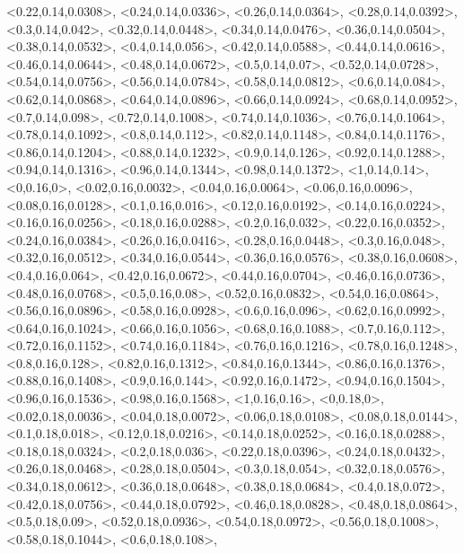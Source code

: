 \documentclass[a4paper,10pt]{article}
\begin{document}
\begin{eulernotebook}
\begin{euleroutput}
  <0.22,0.14,0.0308>,
  <0.24,0.14,0.0336>,
  <0.26,0.14,0.0364>,
  <0.28,0.14,0.0392>,
  <0.3,0.14,0.042>,
  <0.32,0.14,0.0448>,
  <0.34,0.14,0.0476>,
  <0.36,0.14,0.0504>,
  <0.38,0.14,0.0532>,
  <0.4,0.14,0.056>,
  <0.42,0.14,0.0588>,
  <0.44,0.14,0.0616>,
  <0.46,0.14,0.0644>,
  <0.48,0.14,0.0672>,
  <0.5,0.14,0.07>,
  <0.52,0.14,0.0728>,
  <0.54,0.14,0.0756>,
  <0.56,0.14,0.0784>,
  <0.58,0.14,0.0812>,
  <0.6,0.14,0.084>,
  <0.62,0.14,0.0868>,
  <0.64,0.14,0.0896>,
  <0.66,0.14,0.0924>,
  <0.68,0.14,0.0952>,
  <0.7,0.14,0.098>,
  <0.72,0.14,0.1008>,
  <0.74,0.14,0.1036>,
  <0.76,0.14,0.1064>,
  <0.78,0.14,0.1092>,
  <0.8,0.14,0.112>,
  <0.82,0.14,0.1148>,
  <0.84,0.14,0.1176>,
  <0.86,0.14,0.1204>,
  <0.88,0.14,0.1232>,
  <0.9,0.14,0.126>,
  <0.92,0.14,0.1288>,
  <0.94,0.14,0.1316>,
  <0.96,0.14,0.1344>,
  <0.98,0.14,0.1372>,
  <1,0.14,0.14>,
  <0,0.16,0>,
  <0.02,0.16,0.0032>,
  <0.04,0.16,0.0064>,
  <0.06,0.16,0.0096>,
  <0.08,0.16,0.0128>,
  <0.1,0.16,0.016>,
  <0.12,0.16,0.0192>,
  <0.14,0.16,0.0224>,
  <0.16,0.16,0.0256>,
  <0.18,0.16,0.0288>,
  <0.2,0.16,0.032>,
  <0.22,0.16,0.0352>,
  <0.24,0.16,0.0384>,
  <0.26,0.16,0.0416>,
  <0.28,0.16,0.0448>,
  <0.3,0.16,0.048>,
  <0.32,0.16,0.0512>,
  <0.34,0.16,0.0544>,
  <0.36,0.16,0.0576>,
  <0.38,0.16,0.0608>,
  <0.4,0.16,0.064>,
  <0.42,0.16,0.0672>,
  <0.44,0.16,0.0704>,
  <0.46,0.16,0.0736>,
  <0.48,0.16,0.0768>,
  <0.5,0.16,0.08>,
  <0.52,0.16,0.0832>,
  <0.54,0.16,0.0864>,
  <0.56,0.16,0.0896>,
  <0.58,0.16,0.0928>,
  <0.6,0.16,0.096>,
  <0.62,0.16,0.0992>,
  <0.64,0.16,0.1024>,
  <0.66,0.16,0.1056>,
  <0.68,0.16,0.1088>,
  <0.7,0.16,0.112>,
  <0.72,0.16,0.1152>,
  <0.74,0.16,0.1184>,
  <0.76,0.16,0.1216>,
  <0.78,0.16,0.1248>,
  <0.8,0.16,0.128>,
  <0.82,0.16,0.1312>,
  <0.84,0.16,0.1344>,
  <0.86,0.16,0.1376>,
  <0.88,0.16,0.1408>,
  <0.9,0.16,0.144>,
  <0.92,0.16,0.1472>,
  <0.94,0.16,0.1504>,
  <0.96,0.16,0.1536>,
  <0.98,0.16,0.1568>,
  <1,0.16,0.16>,
  <0,0.18,0>,
  <0.02,0.18,0.0036>,
  <0.04,0.18,0.0072>,
  <0.06,0.18,0.0108>,
  <0.08,0.18,0.0144>,
  <0.1,0.18,0.018>,
  <0.12,0.18,0.0216>,
  <0.14,0.18,0.0252>,
  <0.16,0.18,0.0288>,
  <0.18,0.18,0.0324>,
  <0.2,0.18,0.036>,
  <0.22,0.18,0.0396>,
  <0.24,0.18,0.0432>,
  <0.26,0.18,0.0468>,
  <0.28,0.18,0.0504>,
  <0.3,0.18,0.054>,
  <0.32,0.18,0.0576>,
  <0.34,0.18,0.0612>,
  <0.36,0.18,0.0648>,
  <0.38,0.18,0.0684>,
  <0.4,0.18,0.072>,
  <0.42,0.18,0.0756>,
  <0.44,0.18,0.0792>,
  <0.46,0.18,0.0828>,
  <0.48,0.18,0.0864>,
  <0.5,0.18,0.09>,
  <0.52,0.18,0.0936>,
  <0.54,0.18,0.0972>,
  <0.56,0.18,0.1008>,
  <0.58,0.18,0.1044>,
  <0.6,0.18,0.108>,

\end{euleroutput}
\end{eulernotebook}
\end{document}
